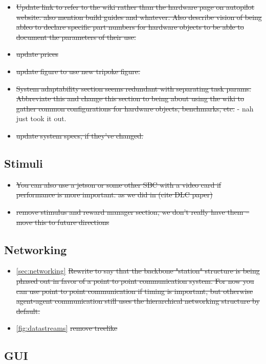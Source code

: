 \begin{itemize}
\item \sout{Update link to refer to the wiki rather than the hardware page on autopilot website. also mention build guides and whatever. Also describe vision of being ableo to declare specific part numbers for hardware objects to be able to document the parameters of their use.}
\item \sout{update prices}
\item \sout{update figure to use new tripoke figure.}
\item \sout{System adaptability section seems redundant with separating task params. Abbreviate this and change this section to being about using the wiki to gather common configurations for hardware objects, benchmarks, etc.} - nah just took it out.
\item \sout{update system specs, if they've changed.}
\end{itemize}

\subsection{Stimuli}

\begin{itemize}
\item \sout{You can also use a jetson or some other SBC with a video card if performance is more important. as we did in (cite DLC paper)}
\item \sout{remove stimulus and reward manager section, we don't really have them -- move this to future directions}
\end{itemize}


\subsection{Networking}

\begin{itemize}
\item \ref{sec:networking} \sout{Rewrite to say that the backbone "station" structure is being phased out in favor of a point to point communication system. For now you can use point to point communication if timing is important, but otherwise agent-agent communication still uses the hierarchical networking structure by default.}
\item \ref{fig:datastreams} \sout{remove treelike}
\end{itemize}

\subsection{GUI}

